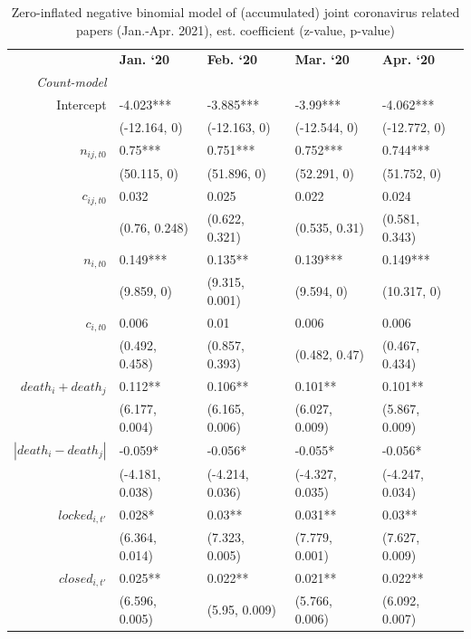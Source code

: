 \begin{table}[ht]
\begin{threeparttable}
\centering
\caption{Zero-inflated negative binomial model of (accumulated) joint coronavirus related papers (Jan.-Apr. 2021), est. coefficient (z-value, p-value)}
\label{tab:jointCRR_extended}
\begin{small}
\begin{tabular}{rllll}
\hline\noalign{\smallskip}
  & {\bf Jan. `20}  & {\bf Feb. `20} & {\bf Mar. `20} & {\bf Apr. `20}    \\ 
\noalign{\smallskip}\hline\noalign{\smallskip}
       	\textit{Count-model} & & & &  \\
\noalign{\smallskip}
Intercept & -4.023*** & -3.885*** & -3.99*** & -4.062*** \\ 
   & (-12.164, 0) & (-12.163, 0) & (-12.544, 0) & (-12.772, 0) \\ 
  $n_{ij,t0}$ & 0.75*** & 0.751*** & 0.752*** & 0.744*** \\ 
   & (50.115, 0) & (51.896, 0) & (52.291, 0) & (51.752, 0) \\ 
    $c_{ij,t0}$ & 0.032 & 0.025 & 0.022 & 0.024 \\ 
   & (0.76, 0.248) & (0.622, 0.321) & (0.535, 0.31) & (0.581, 0.343) \\ 
  $n_{i,t0}$ & 0.149*** & 0.135** & 0.139*** & 0.149*** \\ 
   & (9.859, 0) & (9.315, 0.001) & (9.594, 0) & (10.317, 0) \\ 
  $c_{i,t0}$  & 0.006 & 0.01 & 0.006 & 0.006 \\ 
   & (0.492, 0.458) & (0.857, 0.393) & (0.482, 0.47) & (0.467, 0.434) \\ 
   $death_i + death_j$ & 0.112** & 0.106** & 0.101** & 0.101** \\ 
   & (6.177, 0.004) & (6.165, 0.006) & (6.027, 0.009) & (5.867, 0.009) \\ 
   $|death_i - death_j|$ & -0.059* & -0.056* & -0.055* & -0.056* \\ 
   & (-4.181, 0.038) & (-4.214, 0.036) & (-4.327, 0.035) & (-4.247, 0.034) \\ 
  $locked_{i,t'}$ & 0.028* & 0.03** & 0.031** & 0.03** \\ 
   & (6.364, 0.014) & (7.323, 0.005) & (7.779, 0.001) & (7.627, 0.009) \\ 
 $closed_{i,t'}$ & 0.025** & 0.022** & 0.021** & 0.022** \\ 
   & (6.596, 0.005) & (5.95, 0.009) & (5.766, 0.006) & (6.092, 0.007) \\ 

\end{tabular}
\end{small}
\end{threeparttable}
\end{table}
